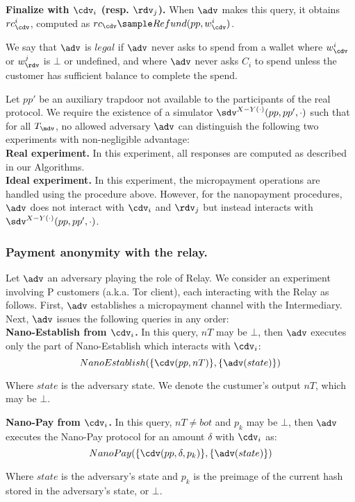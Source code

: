 \textbf{Finalize with $\cdv_i$ (resp. $\rdv_j$).} When $\adv$ makes this query, it obtains $rc^i_\cdv$, computed as $rc_\cdv \sample Refund(pp, w^i_\cdv)$.

We say that $\adv$ is $legal$ if $\adv$ never asks to spend from a wallet where $w^i_\cdv$ or $w^j_\rdv$ is $\bot$ or undefined, and where $\adv$ never asks $C_i$ to spend unless the customer has sufficient balance to complete the spend.

Let $pp'$ be an auxiliary trapdoor not available to the participants of the real protocol. We require the existence of a simulator $\sdv^{X-Y(\cdot)}(pp, pp', \cdot)$ such that for all $T_\mdv$, no allowed adversary $\adv$ can distinguish the following two experiments with non-negligible advantage:\\
\textbf{Real experiment.} In this experiment, all responses are computed as described in our Algorithms.\\
\textbf{Ideal experiment.} In this experiment, the micropayment operations are handled using the procedure above. However, for the nanopayment procedures, $\adv$ does not interact with $\cdv_i$ and $\rdv_j$ but instead interacts with $\sdv^{X-Y(\cdot)}(pp,pp',\cdot)$.

\subsubsection{Payment anonymity with the relay.}

Let $\adv$ an adversary playing the role of Relay. We consider an experiment involving P customers (a.k.a. Tor client), each interacting with the Relay as follows. First, $\adv$ establishes a micropayment channel with the Intermediary. Next, $\adv$ issues the following queries in any order:\\

\textbf{Nano-Establish from $\cdv_i$.} In this query, $nT$ may be $\bot$, then $\adv$ executes only the part of Nano-Establish which interacts with $\cdv_i$:
$$Nano\-Establish(\{\cdv(pp, nT)\}, \{\adv(state)\})$$

Where $state$ is the adversary state. We denote the custumer's output $nT$, which may be $\bot$.


\textbf{Nano-Pay from $\cdv_i$.} In this query, $nT \neq bot$ and $p_k$ may be $\bot$, then $\adv$ executes the Nano-Pay protocol for an amount $\delta$ with $\cdv_i$ as:
$$Nano\-Pay(\{\cdv(pp, \delta, p_k)\}, \{\adv(state)\})$$

Where $state$ is the adversary's state and $p_k$ is the preimage of the current hash stored in the adversary's state, or $\bot$.

